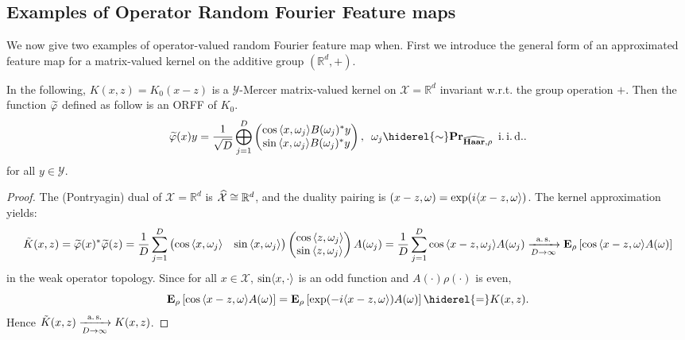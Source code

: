 \subsection{Examples of Operator Random Fourier Feature maps}
We now give two examples of operator-valued random Fourier feature map when. First we introduce the general form of an approximated feature map for a matrix-valued kernel on the additive group $(\mathbb{R}^d,+)$.
\begin{example}\label{ex:additive_group}
In the following, $K(x,z)=K_0(x-z)$ is a $\mathcal{Y}$-Mercer matrix-valued kernel on $\mathcal{X}=\mathbb{R}^d$ invariant w.r.t. the group operation $+$. %
Then the function $\tildePhi{1:D}$ defined as follow is an \acl{ORFF} of $K_{0}$.
\begin{dmath*}
\tildePhi{1:D}(x)y=\frac{1}{\sqrt{D}}\Vect_{j=1}^D\begin{pmatrix}\cos{\inner{x,\omega_j}}B(\omega_j)^\adjoint y \\ \sin{\inner{x,\omega_j}}B(\omega_j)^\adjoint y\end{pmatrix}, \enskip \omega_j \hiderel{\sim} \probability_{\dual{\Haar},\rho} \enskip\text{\iid}.
\end{dmath*}
for all $y\in\mathcal{Y}$.
\end{example}
\begin{proof}
The (Pontryagin) dual of $\mathcal{X}=\mathbb{R}^d$
is $\widehat{\mathcal{X}}\cong\mathbb{R}^d$, and the duality pairing is $(x-z,\omega)=\exp(i\langle x-z, \omega\rangle)$. The kernel approximation yields:
\begin{dmath*}
\tilde{K}(x,z)=\tildePhi{1:D}(x)^\adjoint \tildePhi{1:D}(z)
= \frac{1}{D} \sum_{j=1}^D \begin{pmatrix} \cos{\inner{x,\omega_j}} & \sin{\inner{x,\omega_j}} \end{pmatrix}\begin{pmatrix}\cos{\inner{z,\omega_j}} \\ \sin{\inner{z,\omega_j}} \end{pmatrix} A(\omega_j)
= \frac{1}{D} \sum_{j=1}^D \cos{\inner{x-z,\omega_j}}A(\omega_j) \\
\converges{\asurely}{D\to\infty}\expectation_\rho\left[\cos{\inner{x-z,\omega}}A(\omega)\right]
\end{dmath*}
in the weak operator topology. Since for all $x\in\mathcal{X}$, $\sin\langle x, \cdot\rangle$ is an odd function and $A(\cdot)\rho(\cdot)$ is even,
\begin{dmath*}
\expectation_\rho\left[\cos{\inner{x-z,\omega}}A(\omega)\right]=\expectation_\rho\left[\exp(-i\inner{x-z,\omega})A(\omega)\right]\hiderel{=}K(x,z).
\end{dmath*}
Hence $\tilde{K}(x,z)\xrightarrow[D\to\infty]{\text{a.\,s.}}K(x,z)$.
\end{proof}
